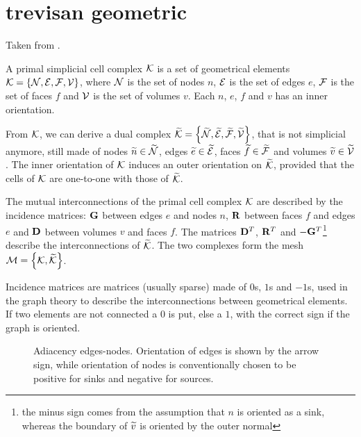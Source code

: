
\section{trevisan geometric}

Taken from \cite{trevisan_geometric}.

A primal simplicial cell complex $\mathcal{K}$ is a set of geometrical
elements $\mathcal{K} = \left\{ \mathcal{N}, \mathcal{E}, \mathcal{F},
\mathcal{V} \right\}$, where $\mathcal{N}$ is the set of nodes $n$,
$\mathcal{E}$ is the set of edges $e$, $\mathcal{F}$ is the set of
faces $f$ and $\mathcal{V}$ is the set of volumes $v$. Each $n$, $e$,
$f$ and $v$ has an inner orientation.


From $\mathcal{K}$, we can derive a dual complex $\widetilde{\mathcal{K}} =
\left\{ \widetilde{\mathcal{N}}, \widetilde{\mathcal{E}}, \widetilde{\mathcal{F}},
\widetilde{\mathcal{V}} \right\}$, that is not simplicial anymore, still
made of nodes $\widetilde{n} \in \widetilde{\mathcal{N}}$, edges $\widetilde{e} \in
\widetilde{\mathcal{E}}$, faces $\widetilde{f} \in \widetilde{\mathcal{F}}$ and
volumes $\widetilde{v} \in \widetilde{\mathcal{V}}$. The inner orientation of
$\mathcal{K}$ induces an outer orientation on $\widetilde{\mathcal{K}}$,
provided that the cells of $\mathcal{K}$ are one-to-one with those of
$\widetilde{\mathcal{K}}$.

The mutual interconnections of the primal cell complex $\mathcal{K}$
are described by the incidence matrices: $\mathbf{G}$ between edges
$e$ and nodes $n$, $\mathbf{R}$ between faces $f$ and edges $e$ and
$\mathbf{D}$ between volumes $v$ and faces $f$. The matrices
${\mathbf{D}}^T$, ${\mathbf{R}}^T$ and
$-{\mathbf{G}}^T$\footnote{the minus sign comes from the
  assumption that $n$ is oriented as a sink, whereas the boundary of
  $\widetilde{v}$ is oriented by the outer normal} describe the
interconnections of $\widetilde{\mathcal{K}}$. The two complexes form the
mesh $\mathcal{M} = \left\{ \mathcal{K}, \widetilde{\mathcal{K}} \right\}$.

Incidence matrices are matrices (usually sparse) made of $0$s, $1$s
and $-1$s, used in the graph theory to describe the interconnections
between geometrical elements. If two elements are not connected a $0$
is put, else a $1$, with the correct sign if the graph is
oriented.

\begin{figure}[htbp]
  \begin{center}
    \resizebox{4cm}{!}{}
  \end{center}
  \caption{Adiacency edges-nodes. Orientation of edges is shown by the
  arrow sign, while orientation of nodes is conventionally chosen to
  be positive for sinks and negative for sources.}
  \label{fig:adiacency_e_n}
\end{figure}

